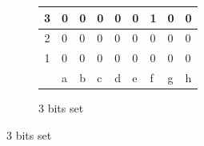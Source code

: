 \documentclass[12pt,a4paper,twoside,openright]{book}
\begin{document}
\begin{figure}[htpb]
\begin{subfigure}[b]{0.45\textwidth}
\begin{tabular}{|c|*{8}{>{\centering\arraybackslash}p{0.3cm}|}}
{\scriptsize 3} & \tiny 0 & \tiny 0 & \tiny 0 & \cellcolor{lightgray}\tiny 0 & \tiny 0 & \tiny\textbf{1} & \tiny 0 & \tiny 0 \\[2pt] \hline
{\scriptsize 2} & \tiny 0 & \tiny 0 & \tiny 0 & \tiny 0 & \tiny 0 & \tiny 0 & \tiny 0 & \tiny 0 \\[2pt] \hline
{\scriptsize 1} & \tiny 0 & \tiny 0 & \tiny 0 & \tiny 0 & \tiny 0 & \tiny 0 & \tiny 0 & \tiny 0 \\[2pt] \hline
\multicolumn{1}{c|}{} & \scriptsize a & \scriptsize b & \scriptsize c & \scriptsize d & \scriptsize e & \scriptsize f & \scriptsize g & \scriptsize h \\
\cline{2-9}
\end{tabular}
\caption{3 bits set}
\end{subfigure}

\vspace{0.8cm}


\end{figure}
\end{document}
